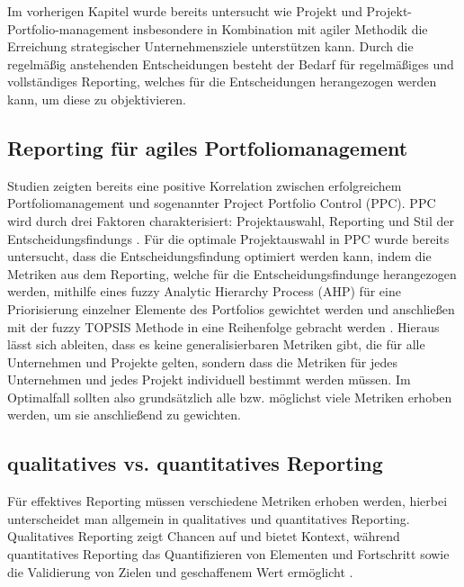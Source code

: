Im vorherigen Kapitel wurde bereits untersucht wie Projekt und Projekt-Portfolio-management insbesondere in Kombination mit agiler Methodik die Erreichung strategischer Unternehmensziele unterstützen kann. Durch die regelmäßig anstehenden Entscheidungen besteht der Bedarf für regelmäßiges und vollständiges Reporting, welches für die Entscheidungen herangezogen werden kann, um diese zu objektivieren.

\subsection{Reporting für agiles Portfoliomanagement}
Studien zeigten bereits eine positive Korrelation zwischen erfolgreichem Portfoliomanagement und sogenannter Project Portfolio Control (PPC). PPC wird durch drei Faktoren charakterisiert: Projektauswahl, Reporting und Stil der Entscheidungsfindungs \cite{ProjectPortfolioControl}.
Für die optimale Projektauswahl in PPC wurde bereits untersucht, dass die Entscheidungsfindung optimiert werden kann, indem die Metriken aus dem Reporting, welche für die Entscheidungsfindunge herangezogen werden, mithilfe eines fuzzy Analytic Hierarchy Process (AHP) für eine Priorisierung einzelner Elemente des Portfolios gewichtet werden und anschließen mit der fuzzy TOPSIS Methode in eine Reihenfolge gebracht werden \cite{Mohammed2021}.
Hieraus lässt sich ableiten, dass es keine generalisierbaren Metriken gibt, die für alle Unternehmen und Projekte gelten, sondern dass die Metriken für jedes Unternehmen und jedes Projekt individuell bestimmt werden müssen. Im Optimalfall sollten also grundsätzlich alle bzw. möglichst viele  Metriken erhoben werden, um sie anschließend zu gewichten.

\subsection{qualitatives vs. quantitatives Reporting}
Für effektives Reporting müssen verschiedene Metriken erhoben werden, hierbei unterscheidet man allgemein in qualitatives und quantitatives Reporting.
Qualitatives Reporting zeigt Chancen auf und bietet Kontext, während quantitatives Reporting das Quantifizieren von Elementen und Fortschritt sowie die Validierung von Zielen und geschaffenem Wert ermöglicht \cite{}.

